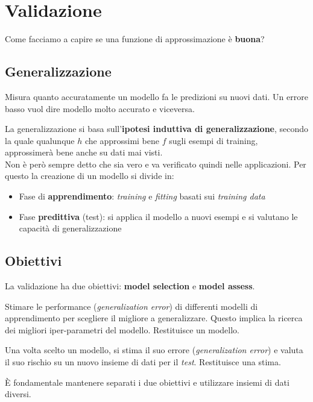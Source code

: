 \newpage
\section{Validazione}
Come facciamo a capire se una funzione di approssimazione è \textbf{buona}?
\subsection{Generalizzazione}
\begin{definition}
	Misura quanto accuratamente un modello fa le predizioni su nuovi dati. Un errore basso vuol dire modello molto accurato e viceversa.
\end{definition}
La generalizzazione si basa sull'\textbf{ipotesi induttiva di generalizzazione}, secondo la quale qualunque $h$ che approssimi bene $f$ sugli esempi di training, approssimerà bene anche su dati mai visti.\\
Non è però sempre detto che sia vero e va verificato quindi nelle applicazioni. Per questo la creazione di un modello si divide in:
\begin{itemize}
	\item Fase di \textbf{apprendimento}: \textit{training} e \textit{fitting} basati sui \textit{training data}
	\item Fase \textbf{predittiva} (test): si applica il modello a nuovi esempi e si valutano le capacità di generalizzazione
\end{itemize}
\subsection{Obiettivi}
La validazione ha due obiettivi: \textbf{model selection} e \textbf{model assess}.
\begin{definition}
	Stimare le performance (\textit{generalization error}) di differenti modelli di apprendimento per scegliere il migliore a generalizzare. Questo implica la ricerca dei migliori iper-parametri del modello. Restituisce un modello.
\end{definition}
\begin{definition}
	Una volta scelto un modello, si stima il suo errore (\textit{generalization error}) e valuta il suo rischio su un nuovo insieme di dati per il \textit{test}. Restituisce una stima.
\end{definition}
È fondamentale mantenere separati i due obiettivi e utilizzare insiemi di dati diversi.

